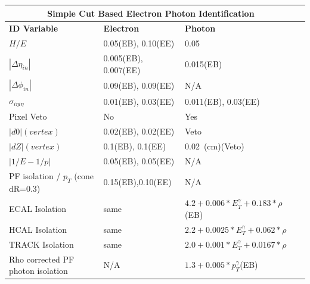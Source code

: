 \begin{center}
\centering
\begin{tabular}{|l|l|p{3.2cm}|p{3.9cm}|}
  \hline \hline
  \multicolumn{3}{|c|}{\bfseries{Simple Cut Based Electron Photon Identification}} \\
  \hline \hline
  \bfseries{ID Variable} & \bfseries{Electron} & \bfseries{Photon} \\
   \hline \hline 
  $H/E$ & 0.05(EB), 0.10(EE)  & 0.05 \\
  \hline
  $|\Delta \eta_{in}|$ & 0.005(EB), 0.007(EE)  & 0.015(EB)  \\
  \hline
   $|\Delta \phi_{in}|$ & 0.09(EB), 0.09(EE)  & N/A \\ \hline
   $\sigma_{i\eta i\eta}$ & 0.01(EB), 0.03(EE) & 0.011(EB), 0.03(EE)  \\
   \hline
   Pixel Veto & No & Yes \\
   \hline
   $|d0|(vertex)$ & 0.02(EB), 0.02(EE) &  Veto \\
   \hline
    $|dZ|(vertex)$ & 0.1(EB), 0.1(EE) & 0.02~(cm)(Veto) \\
    \hline
     $|1/E - 1/p|$ & 0.05(EB), 0.05(EE) & N/A \\
     \hline
     PF isolation / $p_{T}$ (cone dR=0.3) & 0.15(EB),0.10(EE) &  N/A \\
     \hline
     ECAL Isolation & same  & $4.2 + 0.006*E^{\gamma}_{T} + 0.183*\rho$(EB) \\
     \hline
     HCAL Isolation & same & $2.2 + 0.0025*E^{\gamma}_{T} + 0.062*\rho$ \\
     \hline
     TRACK Isolation & same  & $2.0 + 0.001*E^{\gamma}_{T} + 0.0167*\rho$ \\
     \hline
     Rho corrected PF photon isolation & N/A & $1.3 + 0.005*p^{\gamma}_{T}$(EB) \\     
     
   \hline  \hline
  \end{tabular}
 \label{tab:EgammaID} %
 \end{center}



